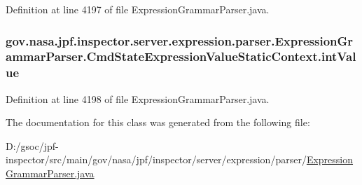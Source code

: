 Definition at line 4197 of file Expression\+Grammar\+Parser.\+java.

\subsubsection[{\texorpdfstring{int\+Value}{intValue}}]{ gov.\+nasa.\+jpf.\+inspector.\+server.\+expression.\+parser.\+Expression\+Grammar\+Parser.\+Cmd\+State\+Expression\+Value\+Static\+Context.\+int\+Value}\hypertarget{classgov_1_1nasa_1_1jpf_1_1inspector_1_1server_1_1expression_1_1parser_1_1_expression_grammar_pa08e6165e66cacb4d3382a343315ee767_a1537250f7804b80a0c01a36cb07f2d43}{}\label{classgov_1_1nasa_1_1jpf_1_1inspector_1_1server_1_1expression_1_1parser_1_1_expression_grammar_pa08e6165e66cacb4d3382a343315ee767_a1537250f7804b80a0c01a36cb07f2d43}


Definition at line 4198 of file Expression\+Grammar\+Parser.\+java.



The documentation for this class was generated from the following file\+:\begin{DoxyCompactItemize}
\item 
D\+:/gsoc/jpf-\/inspector/src/main/gov/nasa/jpf/inspector/server/expression/parser/\hyperlink{_expression_grammar_parser_8java}{Expression\+Grammar\+Parser.\+java}\end{DoxyCompactItemize}
